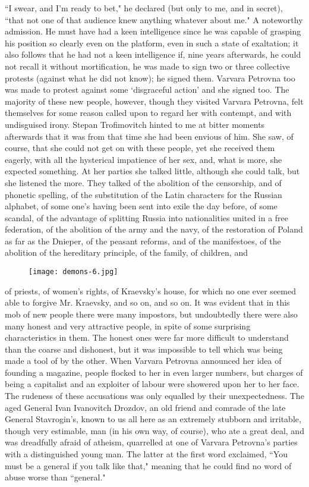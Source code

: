 \documentclass[12pt]{article}
\begin{document}
``I swear, and I'm ready to bet," he declared (but only to me, and in
secret), ``that not one of that audience knew anything whatever about
me." A noteworthy admission. He must have had a keen intelligence since
he was capable of grasping his position so clearly even on the platform,
even in such a state of exaltation; it also follows that he had not
a keen intelligence if, nine years afterwards, he could not recall
it without mortification, he was made to sign two or three collective
protests (against what he did not know); he signed them. Varvara
Petrovna too was made to protest against some `disgraceful action' and
she signed too. The majority of these new people, however, though they
visited Varvara Petrovna, felt themselves for some reason called upon
to regard her with contempt, and with undisguised irony. Stepan
Trofimovitch hinted to me at bitter moments afterwards that it was from
that time she had been envious of him. She saw, of course, that she
could not get on with these people, yet she received them eagerly,
with all the hysterical impatience of her sex, and, what is more, she
expected something. At her parties she talked little, although she could
talk, but she listened the more. They talked of the abolition of the
censorship, and of phonetic spelling, of the substitution of the Latin
characters for the Russian alphabet, of some one's having been sent into
exile the day before, of some scandal, of the advantage of splitting
Russia into nationalities united in a free federation, of the abolition
of the army and the navy, of the restoration of Poland as far as
the Dnieper, of the peasant reforms, and of the manifestoes, of the
abolition of the hereditary principle, of the family, of children, and
\begin{figure}[!ht]
\begin{center}
\texttt{[image: demons-6.jpg]}
\end{center}
\end{figure}
of priests, of women's rights, of Kraevsky's house, for which no one
ever seemed able to forgive Mr. Kraevsky, and so on, and so on. It was
evident that in this mob of new people there were many impostors, but
undoubtedly there were also many honest and very attractive people, in
spite of some surprising characteristics in them. The honest ones were
far more difficult to understand than the coarse and dishonest, but it
was impossible to tell which was being made a tool of by the other.
When Varvara Petrovna announced her idea of founding a magazine, people
flocked to her in even larger numbers, but charges of being a capitalist
and an exploiter of labour were showered upon her to her face. The
rudeness of these accusations was only equalled by their unexpectedness.
The aged General Ivan Ivanovitch Drozdov, an old friend and comrade
of the late General Stavrogin's, known to us all here as an extremely
stubborn and irritable, though very estimable, man (in his own way, of
course), who ate a great deal, and was dreadfully afraid of atheism,
quarrelled at one of Varvara Petrovna's parties with a distinguished
young man. The latter at the first word exclaimed, ``You must be a
general if you talk like that," meaning that he could find no word of
abuse worse than ``general."
\end{document}

